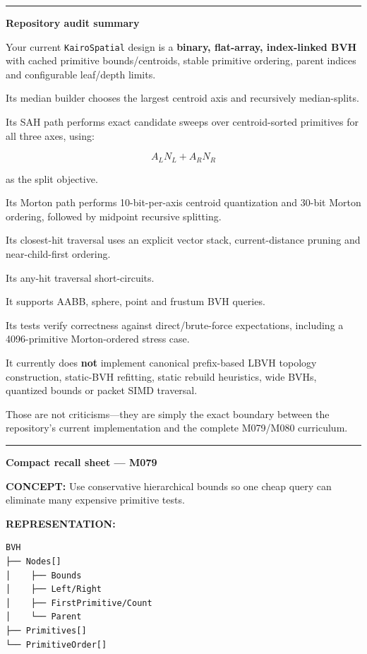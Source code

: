 \begin{center}\rule{0.5\linewidth}{0.5pt}\end{center}

\textbf{Repository audit summary}

Your current \texttt{KairoSpatial} design is a \textbf{binary, flat-array, index-linked BVH} with cached primitive bounds/centroids, stable primitive ordering, parent indices and configurable leaf/depth limits.

Its median builder chooses the largest centroid axis and recursively median-splits.

Its SAH path performs exact candidate sweeps over centroid-sorted primitives for all three axes, using:

\[
A_LN_L+A_RN_R
\]

as the split objective.

Its Morton path performs 10-bit-per-axis centroid quantization and 30-bit Morton ordering, followed by midpoint recursive splitting.

Its closest-hit traversal uses an explicit vector stack, current-distance pruning and near-child-first ordering.

Its any-hit traversal short-circuits.

It supports AABB, sphere, point and frustum BVH queries.

Its tests verify correctness against direct/brute-force expectations, including a 4096-primitive Morton-ordered stress case.

It currently does \textbf{not} implement canonical prefix-based LBVH topology construction, static-BVH refitting, static rebuild heuristics, wide BVHs, quantized bounds or packet SIMD traversal.

Those are not criticisms---they are simply the exact boundary between the repository's current implementation and the complete M079/M080 curriculum.

\begin{center}\rule{0.5\linewidth}{0.5pt}\end{center}

\textbf{Compact recall sheet --- M079}

\textbf{CONCEPT:} Use conservative hierarchical bounds so one cheap query can eliminate many expensive primitive tests.

\textbf{REPRESENTATION:}

\begin{verbatim}
BVH
├── Nodes[]
│    ├── Bounds
│    ├── Left/Right
│    ├── FirstPrimitive/Count
│    └── Parent
├── Primitives[]
└── PrimitiveOrder[]
\end{verbatim}

